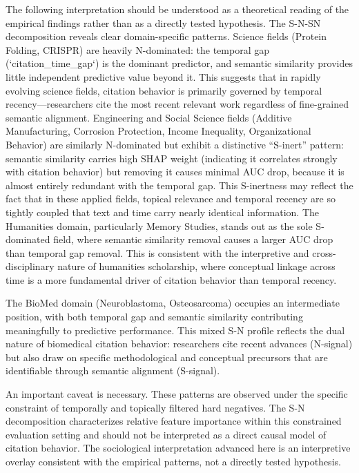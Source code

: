 \documentclass[11pt,a4paper]{article}
\begin{document}
The following interpretation should be understood as a theoretical reading of the empirical findings rather than as a directly tested hypothesis. The S-N-SN decomposition reveals clear domain-specific patterns. Science fields (Protein Folding, CRISPR) are heavily N-dominated: the temporal gap (`citation_time_gap`) is the dominant predictor, and semantic similarity provides little independent predictive value beyond it. This suggests that in rapidly evolving science fields, citation behavior is primarily governed by temporal recency---researchers cite the most recent relevant work regardless of fine-grained semantic alignment. Engineering and Social Science fields (Additive Manufacturing, Corrosion Protection, Income Inequality, Organizational Behavior) are similarly N-dominated but exhibit a distinctive ``S-inert'' pattern: semantic similarity carries high SHAP weight (indicating it correlates strongly with citation behavior) but removing it causes minimal AUC drop, because it is almost entirely redundant with the temporal gap. This S-inertness may reflect the fact that in these applied fields, topical relevance and temporal recency are so tightly coupled that text and time carry nearly identical information. The Humanities domain, particularly Memory Studies, stands out as the sole S-dominated field, where semantic similarity removal causes a larger AUC drop than temporal gap removal. This is consistent with the interpretive and cross-disciplinary nature of humanities scholarship, where conceptual linkage across time is a more fundamental driver of citation behavior than temporal recency.

The BioMed domain (Neuroblastoma, Osteosarcoma) occupies an intermediate position, with both temporal gap and semantic similarity contributing meaningfully to predictive performance. This mixed S-N profile reflects the dual nature of biomedical citation behavior: researchers cite recent advances (N-signal) but also draw on specific methodological and conceptual precursors that are identifiable through semantic alignment (S-signal).

An important caveat is necessary. These patterns are observed under the specific constraint of temporally and topically filtered hard negatives. The S-N decomposition characterizes relative feature importance within this constrained evaluation setting and should not be interpreted as a direct causal model of citation behavior. The sociological interpretation advanced here is an interpretive overlay consistent with the empirical patterns, not a directly tested hypothesis.
\end{document}
